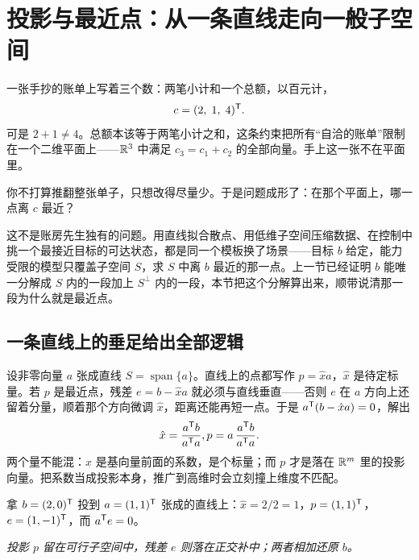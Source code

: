\section{投影与最近点：从一条直线走向一般子空间}
\label{sec:03-Linear-Algebra/03-Orthogonality/02}

一张手抄的账单上写着三个数：两笔小计和一个总额，以百元计，
\[
c=(2,\;1,\;4)^{\mathsf{T}}.
\]
可是 \(2+1\neq4\)。总额本该等于两笔小计之和，这条约束把所有``自洽的账单''限制在一个二维平面上——\(\mathbb{R}^3\) 中满足 \(c_3=c_1+c_2\) 的全部向量。手上这一张不在平面里。

你不打算推翻整张单子，只想改得尽量少。于是问题成形了：在那个平面上，哪一点离 \(c\) 最近？

这不是账房先生独有的问题。用直线拟合散点、用低维子空间压缩数据、在控制中挑一个最接近目标的可达状态，都是同一个模板换了场景——目标 \(b\) 给定，能力受限的模型只覆盖子空间 \(S\)，求 \(S\) 中离 \(b\) 最近的那一点。上一节已经证明 \(b\) 能唯一分解成 \(S\) 内的一段加上 \(S^{\perp}\) 内的一段，本节把这个分解算出来，顺带说清那一段为什么就是最近点。

\subsection{一条直线上的垂足给出全部逻辑}

设非零向量 \(a\) 张成直线 \(S=\operatorname{span}\{a\}\)。直线上的点都写作 \(p=\hat x a\)，\(\hat x\) 是待定标量。若 \(p\) 是最近点，残差 \(e=b-\hat xa\) 就必须与直线垂直——否则 \(e\) 在 \(a\) 方向上还留着分量，顺着那个方向微调 \(\hat x\)，距离还能再短一点。于是 \(a^{\mathsf{T}}(b-\hat xa)=0\)，解出
\[
\hat x=\frac{a^{\mathsf{T}}b}{a^{\mathsf{T}}a},
\space
p=a\,\frac{a^{\mathsf{T}}b}{a^{\mathsf{T}}a} .
\]
两个量不能混：\(\hat x\) 是基向量前面的系数，是个标量；而 \(p\) 才是落在 \(\mathbb{R}^m\) 里的投影向量。把系数当成投影本身，推广到高维时会立刻撞上维度不匹配。

拿 \(b=(2,0)^{\mathsf{T}}\) 投到 \(a=(1,1)^{\mathsf{T}}\) 张成的直线上：\(\hat x=2/2=1\)，\(p=(1,1)^{\mathsf{T}}\)，\(e=(1,-1)^{\mathsf{T}}\)，而 \(a^{\mathsf{T}}e=0\)。

\begin{center}

\emph{投影 \(p\) 留在可行子空间中，残差 \(e\) 则落在正交补中；两者相加还原 \(b\)。}
\end{center}

